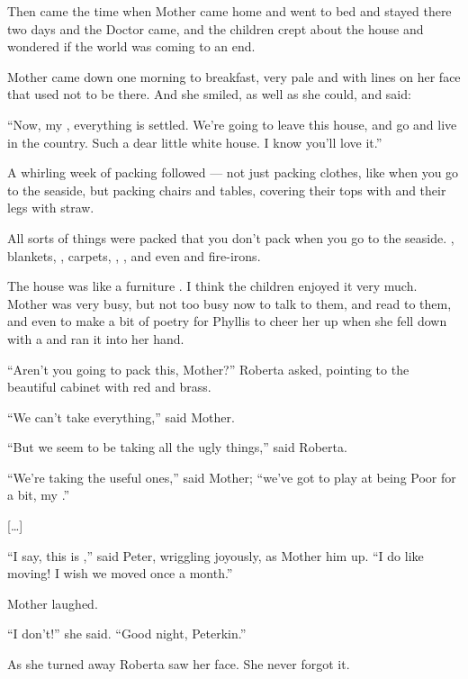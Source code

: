 \documentclass[troisieme]{fiche}
\begin{document}
\begin{texte}
Then came the time when Mother came home and went to bed and stayed there two days and the
Doctor came, and the children crept  about the house
and wondered if the world was coming to an end.

Mother came down one morning to breakfast, very pale and with lines on her face that used not
to be there. And she smiled, as well as she could, and said:

``Now, my , everything is settled. We're going to leave this
house, and go and live in the country. Such a  dear little white
house. I know you'll love it.''

A whirling week of packing followed --- not just packing clothes, like when you go to the
seaside, but packing chairs and tables, covering their tops with
 and their legs with straw.

All sorts of things were packed that you don't pack when you go to the seaside.
, blankets, , carpets, ,
, and even  and
fire-irons.

The house was like a furniture . I think the children
enjoyed it very much. Mother was very busy, but not too busy now to talk to them, and read to
them, and even to make a bit of poetry for Phyllis to cheer her up when she fell down with a
 and ran it into her hand.

``Aren't you going to pack this, Mother?'' Roberta asked, pointing to the beautiful cabinet
 with red  and brass.

``We can't take everything,'' said Mother.

``But we seem to be taking all the ugly things,'' said Roberta.

``We're taking the useful ones,'' said Mother; ``we've got to play at being Poor for a bit,
my .''

[\ldots]

``I say, this is ,'' said Peter, wriggling joyously, as
Mother  him up. ``I do like moving! I wish we
moved once a month.''

Mother laughed.

``I don't!'' she said. ``Good night, Peterkin.''

As she turned away Roberta saw her face. She never forgot it.
\end{texte}
\end{document}
